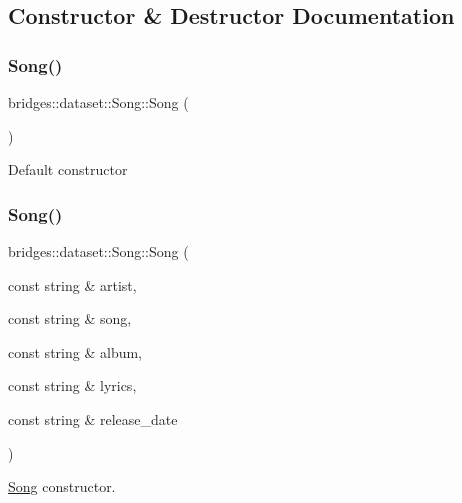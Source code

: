\subsection{Constructor \& Destructor Documentation}
\mbox{\label{classbridges_1_1dataset_1_1_song_a6b7523787312a5b8d16b20b09ab59ea6}} 
\subsubsection{\texorpdfstring{Song()}{Song()}\hspace{0.1cm}{\footnotesize\ttfamily [1/2]}}
{\footnotesize\ttfamily bridges\+::dataset\+::\+Song\+::\+Song (\begin{DoxyParamCaption}{ }\end{DoxyParamCaption})\hspace{0.3cm}{\ttfamily [inline]}}

Default constructor \mbox{\label{classbridges_1_1dataset_1_1_song_a0938ada0b5596c874aa9254f1bde1275}} 
\subsubsection{\texorpdfstring{Song()}{Song()}\hspace{0.1cm}{\footnotesize\ttfamily [2/2]}}
{\footnotesize\ttfamily bridges\+::dataset\+::\+Song\+::\+Song (\begin{DoxyParamCaption}\item[{const string \&}]{artist,  }\item[{const string \&}]{song,  }\item[{const string \&}]{album,  }\item[{const string \&}]{lyrics,  }\item[{const string \&}]{release\+\_\+date }\end{DoxyParamCaption})\hspace{0.3cm}{\ttfamily [inline]}}



\hyperlink{classbridges_1_1dataset_1_1_song}{Song} constructor. 



